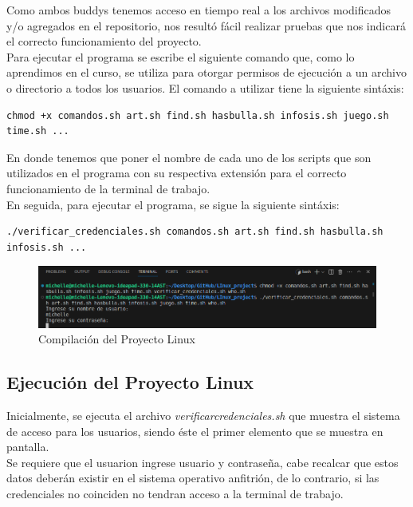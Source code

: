 \documentclass{article}
\begin{document}
 Como ambos buddys tenemos acceso en tiempo real a los archivos modificados y/o agregados en el repositorio, nos resultó fácil realizar pruebas que nos indicará el correcto funcionamiento del proyecto. \\
 
 Para ejecutar el programa se escribe el siguiente comando que, como lo aprendimos en el curso, se utiliza para otorgar permisos de ejecución a un archivo o directorio a todos los usuarios. El comando a utilizar tiene la siguiente sintáxis:
\begin{verbatim}
chmod +x comandos.sh art.sh find.sh hasbulla.sh infosis.sh juego.sh time.sh ...
\end{verbatim}

En donde tenemos que poner el nombre de cada uno de los scripts que son utilizados en el programa con su respectiva extensión para el correcto funcionamiento de la terminal de trabajo. \\

En seguida, para ejecutar el programa, se sigue la siguiente sintáxis:
\begin{verbatim}
./verificar_credenciales.sh comandos.sh art.sh find.sh hasbulla.sh infosis.sh ...
\end{verbatim}
\begin{figure}[ht]
\centering
\includegraphics[width=1\textwidth]{cap3.png}
\caption{\label{fig:frog2}Compilación del Proyecto Linux}
\end{figure}

\subsection*{Ejecución del Proyecto Linux}

Inicialmente, se ejecuta el archivo \textit{verificar}\textunderscore \textit{credenciales.sh} que muestra el sistema de acceso para los usuarios, siendo éste el primer elemento que se muestra en pantalla.\\

Se requiere que el usuarion ingrese usuario y contraseña, cabe recalcar que estos datos deberán existir en el sistema operativo anfitrión, de lo contrario, si las credenciales no coinciden no tendran acceso a la terminal de trabajo. \\
\end{document}
